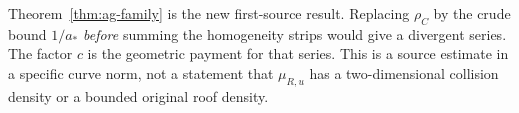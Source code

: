 Theorem~\ref{thm:ag-family} is the new first-source result. Replacing
$\rho_C$ by the crude bound $1/a_*$ \emph{before} summing the
homogeneity strips would give a divergent series. The factor $c$
is the geometric payment for that series. This is a source estimate
in a specific curve norm, not a statement that $\mu_{R,u}$ has a
two-dimensional collision density or a bounded original roof density.

